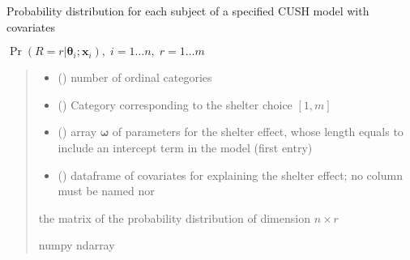 \documentclass[letterpaper,10pt,english]{sphinxmanual}
\begin{document}

\begin{fulllineitems}
\label{\detokenize{cubmods:cubmods.cush_x.pmfi}}
\pysigstartsignatures
{}
\pysigstopsignatures
\sphinxAtStartPar
Probability distribution for each subject of a specified CUSH model with covariates

\sphinxAtStartPar
\(\Pr(R = r | \pmb\theta_i ; \pmb x_i),\; i=1 \ldots n ,\; r=1 \ldots m\)
\begin{quote}\begin{description}
\begin{itemize}
\item {} 
\sphinxAtStartPar
{} () \textendash{} number of ordinal categories

\item {} 
\sphinxAtStartPar
{} () \textendash{} Category corresponding to the shelter choice \([1,m]\)

\item {} 
\sphinxAtStartPar
{} () \textendash{} array \(\pmb \omega\) of parameters for the shelter effect, whose length equals 
 to include an intercept term in the model (first entry)

\item {} 
\sphinxAtStartPar
{} () \textendash{} dataframe of covariates for explaining the shelter effect;
no column must be named  nor 

\end{itemize}

\sphinxAtStartPar
the matrix of the probability distribution of dimension \(n \times r\)

\sphinxAtStartPar
numpy ndarray

\end{description}\end{quote}

\end{fulllineitems}
\end{document}
